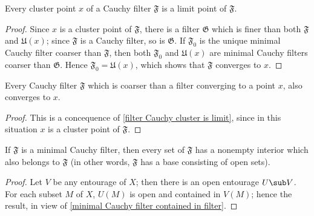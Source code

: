 \begin{corollary}\label{filter Cauchy cluster is limit}
Every cluster point $x$ of a Cauchy filter $\mathfrak{F}$ is a limit point of $\mathfrak{F}$.
\end{corollary}
\begin{proof}
Since $x$ is a cluster point of $\mathfrak{F}$, there is a filter $\mathfrak{G}$ which is finer than both $\mathfrak{F}$ and $\mathfrak{U}(x)$; since $\mathfrak{F}$ is a Cauchy filter, so is $\mathfrak{G}$. If $\mathfrak{F}_0$ is the unique minimal Cauchy filter coarser than $\mathfrak{F}$, then both $\mathfrak{F}_0$ and $\mathfrak{U}(x)$ are minimal Cauchy filters coarser than $\mathfrak{G}$. Hence $\mathfrak{F}_0=\mathfrak{U}(x)$, which shows that $\mathfrak{F}$ converges to $x$.
\end{proof}
\begin{corollary}\label{filter Cauchy coarser than converging is converging}
Every Cauchy filter $\mathfrak{F}$ which is coarser than a filter converging to a point $x$, also converges to $x$.
\end{corollary}
\begin{proof}
This is a concequence of \cref{filter Cauchy cluster is limit}, since in this situation $x$ is a cluster point of $\mathfrak{F}$.
\end{proof}
\begin{corollary}\label{filter minimal Cauchy has open base}
If $\mathfrak{F}$ is a minimal Cauchy filter, then every set of $\mathfrak{F}$ has a nonempty interior which also belongs to $\mathfrak{F}$ (in other words, $\mathfrak{F}$ has a base consisting of open sets).
\end{corollary}
\begin{proof}
Let $V$ be any entourage of $X$; then there is an open entourage $U\sub V$. For each subset $M$ of $X$, $U(M)$ is open and contained in $V(M)$; hence the result, in view of \cref{minimal Cauchy filter contained in filter}.
\end{proof}
